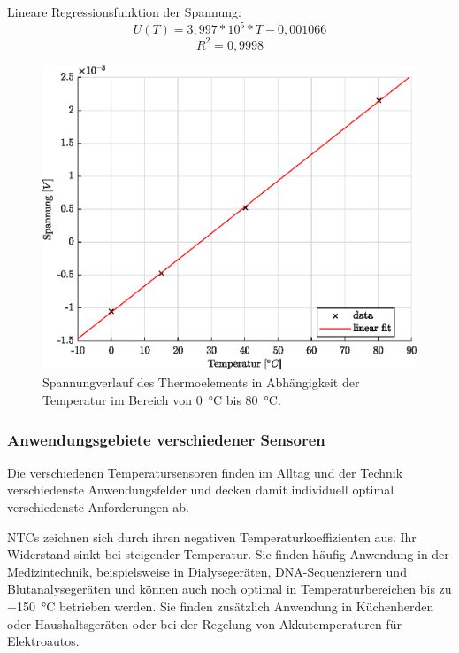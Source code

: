 Lineare Regressionsfunktion der Spannung:
\begin{equation*}
\label{eq:Spannung}
U(T)= 3,997*10^5*T-0,001066
\end{equation*}
\begin{equation*}
R^2=0,9998
\end{equation*}
\begin{figure}[H]
	\centering
	\includegraphics[height=0.3\textheight]{../MLAB/Spannung.eps}
	\caption[Spannungverlauf des Thermoelements in Abhängigkeit der Temperatur im Bereich von \SI{0}{\celsius} bis \SI{80}{\celsius} ]{Spannungverlauf des Thermoelements in Abhängigkeit der Temperatur im Bereich von \SI{0}{\celsius} bis \SI{80}{\celsius}.}
	\label{fig:Spannung}
\end{figure}

\subsubsection{Anwendungsgebiete verschiedener Sensoren}

Die verschiedenen Temperatursensoren finden im Alltag und der Technik verschiedenste Anwendungsfelder und decken damit individuell optimal verschiedenste Anforderungen ab. 

NTCs zeichnen sich durch ihren negativen Temperaturkoeffizienten aus. Ihr Widerstand sinkt bei steigender Temperatur. Sie finden häufig Anwendung in der Medizintechnik, beispielsweise in Dialysegeräten, DNA-Sequenzierern und Blutanalysegeräten und können auch noch optimal in Temperaturbereichen bis zu \SI{-150}{\celsius} betrieben werden. Sie finden zusätzlich Anwendung in Küchenherden oder Haushaltsgeräten oder bei der Regelung von Akkutemperaturen für Elektroautos. 

